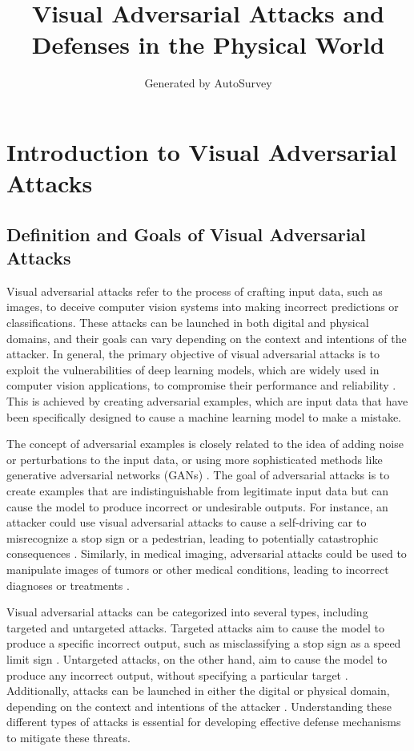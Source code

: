 \documentclass[11pt]{article}
\title{Visual Adversarial Attacks and Defenses in the Physical World}
\author{Generated by AutoSurvey}
\date{}
\begin{document}
\maketitle
\tableofcontents
\newpage

\section{Introduction to Visual Adversarial Attacks}

\subsection{Definition and Goals of Visual Adversarial Attacks}

Visual adversarial attacks refer to the process of crafting input data, such as images, to deceive computer vision systems into making incorrect predictions or classifications. These attacks can be launched in both digital and physical domains, and their goals can vary depending on the context and intentions of the attacker. In general, the primary objective of visual adversarial attacks is to exploit the vulnerabilities of deep learning models, which are widely used in computer vision applications, to compromise their performance and reliability \cite{ref1}. This is achieved by creating adversarial examples, which are input data that have been specifically designed to cause a machine learning model to make a mistake.

The concept of adversarial examples is closely related to the idea of adding noise or perturbations to the input data, or using more sophisticated methods like generative adversarial networks (GANs) \cite{ref2}. The goal of adversarial attacks is to create examples that are indistinguishable from legitimate input data but can cause the model to produce incorrect or undesirable outputs. For instance, an attacker could use visual adversarial attacks to cause a self-driving car to misrecognize a stop sign or a pedestrian, leading to potentially catastrophic consequences \cite{ref3}. Similarly, in medical imaging, adversarial attacks could be used to manipulate images of tumors or other medical conditions, leading to incorrect diagnoses or treatments \cite{ref4}.

Visual adversarial attacks can be categorized into several types, including targeted and untargeted attacks. Targeted attacks aim to cause the model to produce a specific incorrect output, such as misclassifying a stop sign as a speed limit sign \cite{ref5}. Untargeted attacks, on the other hand, aim to cause the model to produce any incorrect output, without specifying a particular target \cite{ref6}. Additionally, attacks can be launched in either the digital or physical domain, depending on the context and intentions of the attacker \cite{ref7}. Understanding these different types of attacks is essential for developing effective defense mechanisms to mitigate these threats.
\end{document}
